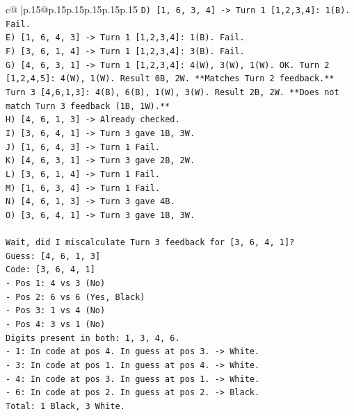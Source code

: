 \documentclass{article}
\begin{document}
{\begin{supertabular}{c@{$\;$}|p{.15\linewidth}@{}p{.15\linewidth}p{.15\linewidth}p{.15\linewidth}p{.15\linewidth}p{.15\linewidth}}
{{{\texttt{D) {[}1, 6, 3, 4{]} {-}> Turn 1 {[}1,2,3,4{]}: 1(B). Fail.} \\
\texttt{E) {[}1, 6, 4, 3{]} {-}> Turn 1 {[}1,2,3,4{]}: 1(B). Fail.} \\
\texttt{F) {[}3, 6, 1, 4{]} {-}> Turn 1 {[}1,2,3,4{]}: 3(B). Fail.} \\
\texttt{G) {[}4, 6, 3, 1{]} {-}> Turn 1 {[}1,2,3,4{]}: 4(W), 3(W), 1(W). OK. Turn 2 {[}1,2,4,5{]}: 4(W), 1(W). Result 0B, 2W. **Matches Turn 2 feedback.** Turn 3 {[}4,6,1,3{]}: 4(B), 6(B), 1(W), 3(W). Result 2B, 2W. **Does not match Turn 3 feedback (1B, 1W).**} \\
\texttt{H) {[}4, 6, 1, 3{]} {-}> Already checked.} \\
\texttt{I) {[}3, 6, 4, 1{]} {-}> Turn 3 gave 1B, 3W.} \\
\texttt{J) {[}1, 6, 4, 3{]} {-}> Turn 1 Fail.} \\
\texttt{K) {[}4, 6, 3, 1{]} {-}> Turn 3 gave 2B, 2W.} \\
\texttt{L) {[}3, 6, 1, 4{]} {-}> Turn 1 Fail.} \\
\texttt{M) {[}1, 6, 3, 4{]} {-}> Turn 1 Fail.} \\
\texttt{N) {[}4, 6, 1, 3{]} {-}> Turn 3 gave 4B.} \\
\texttt{O) {[}3, 6, 4, 1{]} {-}> Turn 3 gave 1B, 3W.} \\
\\ 
\texttt{Wait, did I miscalculate Turn 3 feedback for {[}3, 6, 4, 1{]}?} \\
\texttt{Guess: {[}4, 6, 1, 3{]}} \\
\texttt{Code: {[}3, 6, 4, 1{]}} \\
\texttt{{-} Pos 1: 4 vs 3 (No)} \\
\texttt{{-} Pos 2: 6 vs 6 (Yes, Black)} \\
\texttt{{-} Pos 3: 1 vs 4 (No)} \\
\texttt{{-} Pos 4: 3 vs 1 (No)} \\
\texttt{Digits present in both: 1, 3, 4, 6.} \\
\texttt{{-} 1: In code at pos 4. In guess at pos 3. {-}> White.} \\
\texttt{{-} 3: In code at pos 1. In guess at pos 4. {-}> White.} \\
\texttt{{-} 4: In code at pos 3. In guess at pos 1. {-}> White.} \\
\texttt{{-} 6: In code at pos 2. In guess at pos 2. {-}> Black.} \\
\texttt{Total: 1 Black, 3 White.} \\
}}}
\end{supertabular}}
\end{document}
